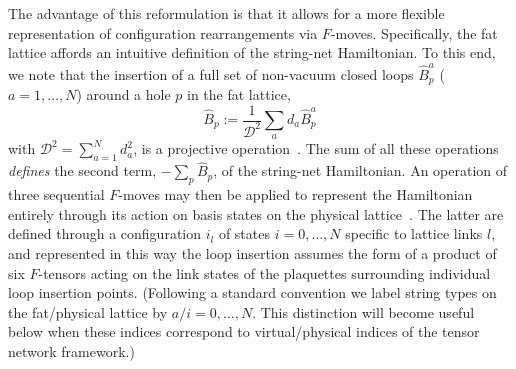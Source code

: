 \documentclass[twocolumn,floats,prx,showpacs]{revtex4-1}
\begin{document}
The advantage of this reformulation is that it allows for a more flexible representation of configuration rearrangements via $F$-moves. Specifically, the fat lattice affords an intuitive definition of the string-net Hamiltonian. To this end, we note that the insertion of a full set of non-vacuum closed loops $\hat B_p^a$ ($a=1,\dots,N$) around a hole $p$ in the fat lattice, 
\begin{equation}
\hat B_p:= \frac{1}{\mathcal{D}^2} \sum_a d_a \hat B_p^a
\end{equation}
 with $\mathcal{D}^2={\sum_{a=1}^N d_a^2}$, is a projective operation~\cite{Levin2005}. The sum of all these operations \emph{defines} the second term, $-\sum_p \hat B_p$, of the string-net Hamiltonian. An operation of three sequential $F$-moves may then be applied to represent the Hamiltonian entirely through its action on basis states on the physical lattice~\cite{Levin2005}. The latter are  defined through a configuration $i_l$ of states $i=0,\dots, N$ specific to lattice links $l$, and represented in this way the loop insertion assumes the form of a product of six $F$-tensors acting on the link states of the plaquettes surrounding individual loop insertion points. (Following a standard convention we label string types on the fat/physical lattice by $a/i=0,\dots,N$. This distinction will become useful below when these indices correspond to virtual/physical indices of the tensor network framework.)
\end{document}
